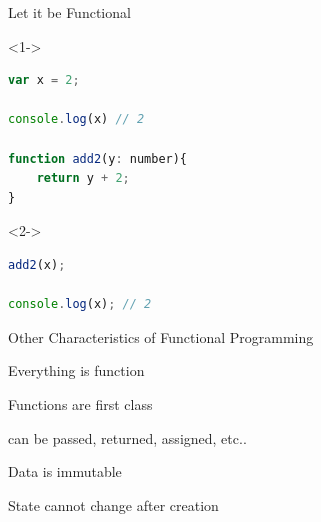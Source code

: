 \documentclass[10pt]{beamer}
\begin{document}
\begin{frame}[fragile]{Let it be Functional}

\begin{overlayarea}{\linewidth}{.8\textheight}

\begin{onlyenv}<1->
\begin{lstlisting}[language=JavaScript]
var x = 2;

console.log(x) // 2

function add2(y: number){
    return y + 2;
}
\end{lstlisting}
\end{onlyenv}

\begin{onlyenv}<2->
\begin{lstlisting}[language=JavaScript,firstnumber=8]
add2(x);

console.log(x); // 2
\end{lstlisting}
\end{onlyenv}


\end{overlayarea}  

\end{frame}

\begin{frame}{Other Characteristics of Functional Programming}

{\Huge Everything is function}

\pause
\large
Functions are first class

\pause
can be passed, returned, assigned, etc..

\bigskip 
\pause
{\Huge Data is immutable}

\pause
State cannot change after creation
    
\end{frame}


\end{document}
